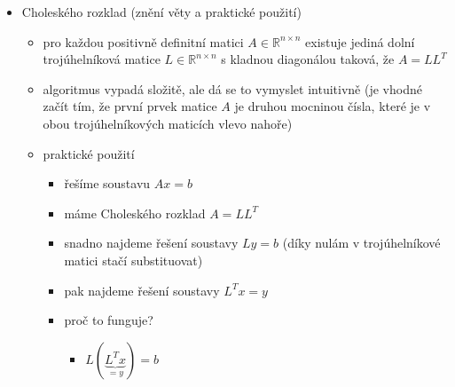 \begin{itemize}
\begin{itemize}
\begin{itemize}
\end{itemize}
\item operace $\braket{x|y}$ je skalárním součinem v $\mathbb R^n$, právě když má tvar $\braket{x|y}=x^TAy$ pro nějakou positivně definitní matici $A\in\mathbb R^{n\times n}$
\item testování p. d. pomocí Gaussovy eliminace
\begin{itemize}
\item používáme pouze úpravu přičtení násobku řádku s pivotem k jinému řádku pod ním
\item pokud nám vyjde odstupňovaný tvar s kladnou diagonálou, byla původní matice positivně definitní
\end{itemize}
\end{itemize}
\item Choleského rozklad (znění věty a praktické použití)
\begin{itemize}
\item pro každou positivně definitní matici $A\in\mathbb R^{n\times n}$ existuje jediná dolní trojúhelníková matice $L\in\mathbb R^{n\times n}$ s kladnou diagonálou taková, že $A=LL^T$
\item algoritmus vypadá složitě, ale dá se to vymyslet intuitivně (je vhodné začít tím, že první prvek matice $A$ je druhou mocninou čísla, které je v obou trojúhelníkových maticích vlevo nahoře)
\item praktické použití
\begin{itemize}
\item řešíme soustavu $Ax=b$
\item máme Choleského rozklad $A=LL^T$
\item snadno najdeme řešení soustavy $Ly=b$ (díky nulám v trojúhelníkové matici stačí substituovat)
\item pak najdeme řešení soustavy $L^Tx=y$
\item proč to funguje?
\begin{itemize}
\item $L(\underbrace{L^Tx}_{=y})=b$
\end{itemize}
\end{itemize}
\end{itemize}
\end{itemize}
